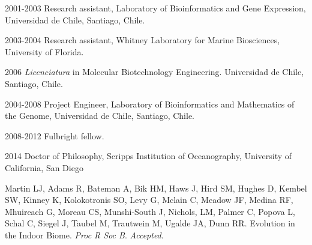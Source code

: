 \begin{frontmatter}
\begin{epigraph}
\end{epigraph}

% 


%
\tableofcontents
\listoffigures  %
\listoftables   %



%
%
\begin{acknowledgements} 


\end{acknowledgements}


%
%
\begin{vitapage}
\begin{vita}
  \item[2001-2003] Research assistant, Laboratory of Bioinformatics and Gene Expression, Universidad de Chile, Santiago, Chile.
  \item[2003-2004] Research assistant, Whitney Laboratory for Marine Biosciences, University of Florida.
  \item[2006] \emph{Licenciatura} in Molecular Biotechnology Engineering. Universidad de Chile, Santiago, Chile.
  \item[2004-2008] Project Engineer, Laboratory of Bioinformatics and Mathematics of the Genome, Universidad de Chile, Santiago, Chile.
  \item[2008-2012] Fulbright fellow.
  \item[2014] Doctor of Philosophy, Scripps Institution of Oceanography, University of California, San Diego 
\end{vita}


\begin{publications}

\item Martin LJ, Adams R, Bateman A, Bik HM, Haws J, Hird SM, Hughes D, Kembel SW, Kinney K, Kolokotronis SO, Levy G, Mclain C, Meadow JF, Medina RF, Mhuireach G, Moreau CS, Munshi-South J, Nichols, LM, Palmer C, Popova L, Schal C, Siegel J, Taubel M, Trautwein M, Ugalde JA, Dunn RR. Evolution in the Indoor Biome. \emph{Proc R Soc B}. \emph{Accepted}.


\end{publications}
\end{vitapage}
\end{frontmatter}
